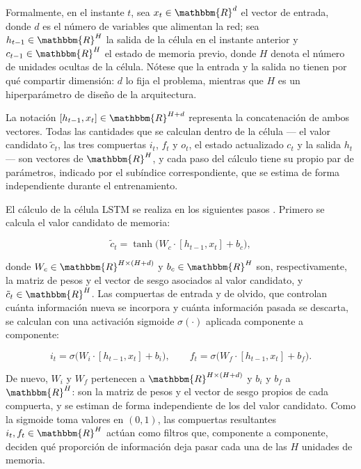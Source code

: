 \documentclass[12pt]{paper}
\begin{document}
Formalmente, en el instante $t$, sea $x_t \in \mathbbm{R}^{d}$ el vector de entrada, donde $d$ es el número de variables que alimentan la red; sea $h_{t-1} \in \mathbbm{R}^{H}$ la salida de la célula en el instante anterior y $c_{t-1} \in \mathbbm{R}^{H}$ el estado de memoria previo, donde $H$ denota el número de unidades ocultas de la célula. Nótese que la entrada y la salida no tienen por qué compartir dimensión: $d$ lo fija el problema, mientras que $H$ es un hiperparámetro de diseño de la arquitectura.

La notación $[h_{t-1}, x_t] \in \mathbbm{R}^{H+d}$ representa la concatenación de ambos vectores. Todas las cantidades que se calculan dentro de la célula --- el valor candidato $\tilde{c}_t$, las tres compuertas $i_t$, $f_t$ y $o_t$, el estado actualizado $c_t$ y la salida $h_t$ --- son vectores de $\mathbbm{R}^{H}$, y cada paso del cálculo tiene su propio par de parámetros, indicado por el subíndice correspondiente, que se estima de forma independiente durante el entrenamiento.

El cálculo de la célula LSTM se realiza en los siguientes pasos \citep{hochreiter1997lstm,graves2006ctc}. Primero se calcula el valor candidato de memoria:

\begin{equation}
    \tilde{c}_t = \tanh\bigl(W_c \cdot [h_{t-1}, x_t] + b_c\bigr),
\end{equation}

donde $W_c \in \mathbbm{R}^{H \times (H+d)}$ y $b_c \in \mathbbm{R}^{H}$ son, respectivamente, la matriz de pesos y el vector de sesgo asociados al valor candidato, y $\tilde{c}_t \in \mathbbm{R}^{H}$. Las compuertas de entrada y de olvido, que controlan cuánta información nueva se incorpora y cuánta información pasada se descarta, se calculan con una activación sigmoide $\sigma(\cdot)$ aplicada componente a componente:

\begin{equation}
    i_t = \sigma\bigl(W_i \cdot [h_{t-1}, x_t] + b_i\bigr),
    \qquad
    f_t = \sigma\bigl(W_f \cdot [h_{t-1}, x_t] + b_f\bigr).
\end{equation}

De nuevo, $W_i$ y $W_f$ pertenecen a $\mathbbm{R}^{H \times (H+d)}$ y $b_i$ y $b_f$ a $\mathbbm{R}^{H}$: son la matriz de pesos y el vector de sesgo propios de cada compuerta, y se estiman de forma independiente de los del valor candidato. Como la sigmoide toma valores en $(0,1)$, las compuertas resultantes $i_t, f_t \in \mathbbm{R}^{H}$ actúan como filtros que, componente a componente, deciden qué proporción de información deja pasar cada una de las $H$ unidades de memoria.
\end{document}
